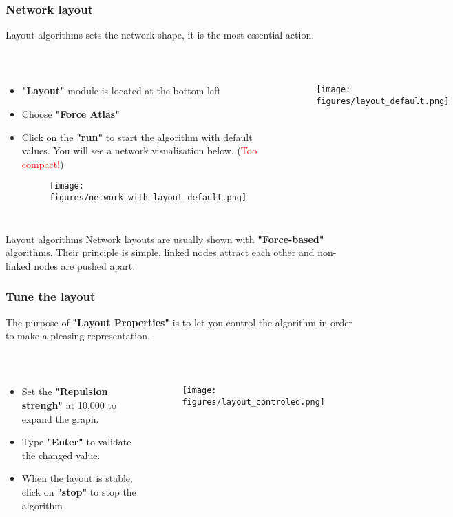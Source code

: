 \documentclass[10pt]{beamer}
\begin{document}
\begin{frame}
\frametitle{Network layout}
Layout algorithms sets the network shape, it is the most essential action. \\~\\

\begin{columns}[c] 
\begin{itemize}
\item \textbf{"Layout"} module is located at the bottom left
\item Choose \textbf{"Force Atlas"}
\item Click on the \textbf{"run"} to start the algorithm with default values. You will see a network visualisation below. (\textcolor{red}{Too compact!})
\begin{figure}
\texttt{[image: figures/network\_with\_layout\_default.png]}
\end{figure}
\end{itemize}

\begin{figure}
\texttt{[image: figures/layout\_default.png]}
\end{figure}
\end{columns}

\begin{block}{Layout algorithms}
Network layouts are usually shown with \textbf{"Force-based"} algorithms. Their principle is simple, linked nodes attract each other and non-linked nodes are pushed apart.
\end{block}
\end{frame}

\begin{frame}
\frametitle{Tune the layout}
The purpose of \textbf{"Layout Properties"} is to let you control the algorithm in order to make a pleasing representation. \\~\\

\begin{columns}[c] 
\begin{itemize}
\item Set the \textbf{"Repulsion strengh"} at 10,000 to expand the graph.
\item Type \textbf{"Enter"} to validate the changed value.
\item When the layout is stable, click on \textbf{"stop"} to stop the algorithm
\end{itemize}

\begin{figure}
\texttt{[image: figures/layout\_controled.png]}
\end{figure}
\end{columns}
\end{frame}
\end{document}
